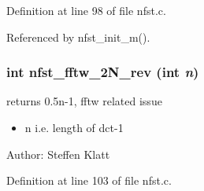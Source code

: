 Definition at line 98 of file nfst.c.

Referenced by nfst\_\-init\_\-m().\hypertarget{group__nfsct_gd31424393fa4e91a19cd9a82776f2d74}{
\subsubsection{\setlength{\rightskip}{0pt plus 5cm}int nfst\_\-fftw\_\-2N\_\-rev (int {\em n})}}
\label{group__nfsct_gd31424393fa4e91a19cd9a82776f2d74}


returns 0.5n-1, fftw related issue 

\begin{itemize}
\item n i.e. length of dct-1\end{itemize}
\begin{Desc}
\item[Author:]Steffen Klatt \end{Desc}


Definition at line 103 of file nfst.c.